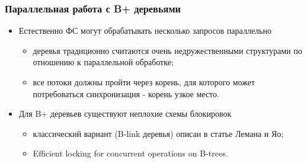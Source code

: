 \begin{frame}
\frametitle{Параллельная работа с B+ деревьями}
\begin{itemize}
  \item Естественно ФС могут обрабатывать несколько запросов параллельно
  \begin{itemize}
    \item деревья традиционно считаются очень недружественными структурами
    по отношению к параллельной обработке;
    \item все потоки должны пройти через корень, для которого может
    потребоваться синхронизация - корень узкое место.
  \end{itemize}
  \item Для B+ деревьев существуют неплохие схемы блокировок
  \begin{itemize}
    \item классический вариант (B-link деревья) описан в статье Лемана и Яо;
    \item Efficient locking for concurrent operations on B-trees.
  \end{itemize}
\end{itemize}
\end{frame}
